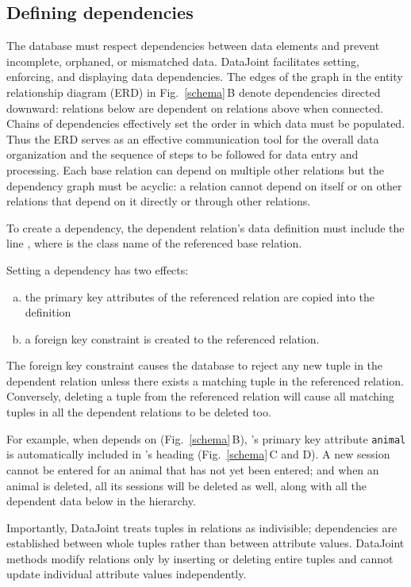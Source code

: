 \subsection*{Defining dependencies}
The database must respect dependencies between data elements and prevent incomplete, orphaned, or mismatched data.
DataJoint facilitates setting, enforcing, and displaying data dependencies. 
The edges of the graph in the entity relationship diagram (ERD) in Fig.\ \ref{schema}\,B denote dependencies directed downward: relations below are dependent on relations above when connected.
Chains of dependencies effectively set the order in which  data must be populated. 
Thus the ERD serves as an effective communication tool for the overall data organization and the sequence of steps to be followed for data entry and  processing.
Each base relation can depend on multiple other relations but the dependency graph must be acyclic: a relation cannot depend on itself or on other relations that depend on it directly or through other relations.

To create a dependency, the dependent relation's data definition must include the line , where  is the class name of the referenced base relation.

Setting a dependency has two effects:
\begin{enumerate}[(a)]
\item the primary key attributes of the referenced relation are copied into the definition 
\item a foreign key constraint is created to the referenced relation.
\end{enumerate}

The foreign key constraint causes the database to reject any new tuple in the dependent relation unless there exists a matching tuple in the referenced relation. 
Conversely, deleting a tuple from the referenced relation will cause all matching tuples in all the dependent relations to be deleted too.

For example, when  depends on  (Fig.\ \ref{schema}\,B),
's primary key attribute {\tt animal} is automatically included in 's heading (Fig.\ \ref{schema}\,C and D). 
A new session cannot be entered for an animal that has not yet been entered;  and when an animal is deleted, all its sessions will be  deleted as well, along with all the dependent data below in the hierarchy.

Importantly, DataJoint treats tuples in relations as indivisible; dependencies are established between whole tuples rather than between attribute values.
DataJoint methods modify relations only by inserting or deleting entire tuples and cannot update individual attribute values independently.

